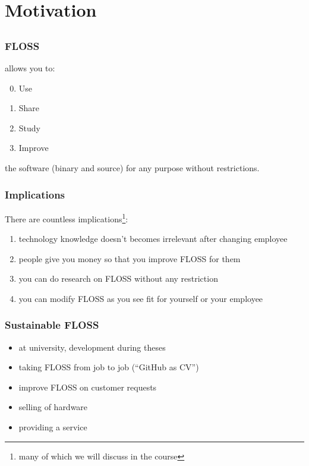\section{Motivation}
\subsection{}
\begin{frame}
	\frametitle{FLOSS}
	\floss{} allows you to:
	\vspace{1em}
	\begin{enumerate}[<+-| alert@+>]
		\setcounter{enumi}{-1}
		\item Use
		\item Share
		\item Study
		\item Improve
	\end{enumerate}
	\vspace{1em}
	\pause[\thebeamerpauses]
	the software (binary and source) for any purpose without restrictions.
\end{frame}

\begin{frame}
	\frametitle{Implications}

	There are countless implications\footnote{many of which we will discuss in the course}:
	\begin{enumerate}[<+-| alert@+>]
		\item technology knowledge doesn't becomes irrelevant after changing employee
		\item people give you money so that you improve FLOSS for them
		\item you can do research on FLOSS without any restriction
		\item you can modify FLOSS as you see fit for yourself or your employee
	\end{enumerate}
\end{frame}

\begin{frame}[fragile]
	\frametitle{Sustainable FLOSS}

	\begin{itemize}[<+-| alert@+>]
		\item at university, development during theses
		\item taking FLOSS from job to job (``GitHub as CV'')
		\item improve FLOSS on customer requests
		\item selling of hardware
		\item providing a service
	\end{itemize}
\end{frame}

